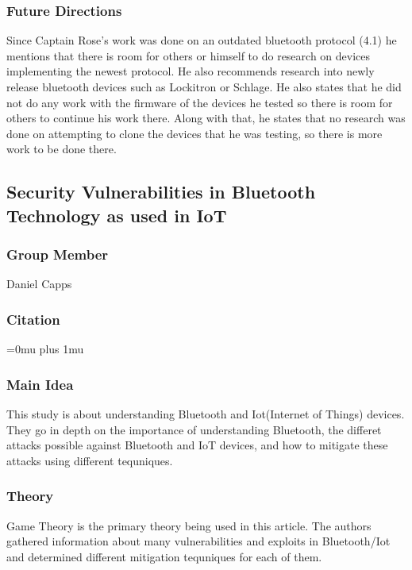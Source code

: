 \subsubsection{Future Directions}

\noindent
Since Captain Rose's work was done on an outdated bluetooth protocol (4.1) he mentions that there is room for others or himself to do research on devices implementing the newest protocol. He also recommends research into newly release bluetooth devices such as Lockitron or Schlage. He also states that he did not do any work with the firmware of the devices he tested so there is room for others to continue his work there. Along with that, he states that no research was done on attempting to clone the devices that he was testing, so there is more work to be done there.

\noindent
\subsection{Security Vulnerabilities in Bluetooth Technology as used in IoT}

\subsubsection{Group Member}

\noindent
Daniel Capps

\noindent
\subsubsection{Citation}

\Urlmuskip=0mu plus 1mu\relax
{}

\subsubsection{Main Idea}

\noindent
This study is about understanding Bluetooth and Iot(Internet of Things) devices. They go in depth on the importance of understanding Bluetooth, the differet attacks possible against Bluetooth and IoT devices, and how to mitigate these attacks using different tequniques.  

\subsubsection{Theory}

\noindent
Game Theory is the primary theory being used in this article.  The authors gathered information about many vulnerabilities and exploits in Bluetooth/Iot and determined different mitigation tequniques for each of them. 

